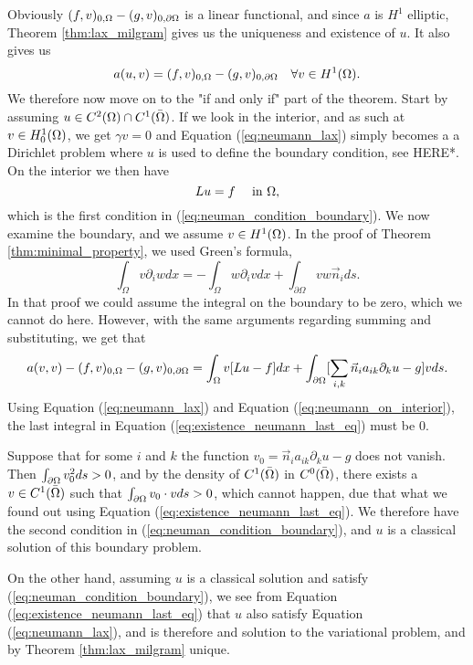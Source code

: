 \begin{bev}
   Obviously $ (f,v)_{0,\Omega} - (g,v)_{0,\partial\Omega}$ is a linear functional, 
   and since $a$ is $H^1$ elliptic, Theorem \ref{thm:lax_milgram} gives us the 
   uniqueness and existence of $u$.
   It also gives us 
   \begin{equation}
      a(u,v) = (f,v)_{0,\Omega} - (g,v)_{0,\partial\Omega} \quad \forall v \in H^1(\Omega). \label{eq:neumann_lax}
   \end{equation}
   We therefore now move on to the "if and only if" part of the theorem. Start by 
   assuming $u \in C^2(\Omega)\cap C^1(\bar{\Omega})$.
   If we look in the interior, and as such at $v \in H^1_0(\Omega)$, we get $\gamma v=0$ 
   and Equation (\ref{eq:neumann_lax}) simply becomes a a Dirichlet problem where 
   $u$ is used to define the boundary condition, see HERE*. %
   On the interior we then have 
   \begin{equation}
    Lu = f \quad \text{ in }\Omega, \label{eq:neumann_on_interior}
   \end{equation} 
   which is the first condition in (\ref{eq:neuman_condition_boundary}).
   We now examine the boundary, and we assume $v\in H^1(\Omega)$.
   In the proof of Theorem \ref{thm:minimal_property}, we used Green's formula,
    \begin{equation} %
        \int_\Omega v\partial_i w dx = -\int_\Omega w \partial_i v dx + \int_{\partial \Omega} v w \vec{n}_i ds.
    \end{equation}
   In that proof we could assume the integral on the boundary to be zero, which 
   we cannot do here. However, with the same arguments regarding summing and substituting, 
   we get that 
   \begin{equation}
      a(v,v) - (f,v)_{0,\Omega} - (g,v)_{0,\partial\Omega} = 
      \int_\Omega v[Lu - f] dx + \int_{\partial \Omega}
     [ \sum_{i,k}  \vec{n}_i a_{ik} \partial_k u-g]v ds.
     \label{eq:existence_neumann_last_eq}
   \end{equation}
   Using Equation (\ref{eq:neumann_lax}) and Equation (\ref{eq:neumann_on_interior}),
   the last integral in Equation (\ref{eq:existence_neumann_last_eq}) must be $0$.

   Suppose that for some $i$ and $k$ the function $v_0 = \vec{n}_i a_{ik} \partial_k u -g$ does 
   not vanish. Then $\int_{\partial\Omega}v_0^2ds>0$, and by the density of 
   $C^1(\bar{\Omega})$ in $C^0(\bar{\Omega})$, there exists a $v\in C^1(\bar{\Omega})$
   such that  $\int_{\partial\Omega}v_0\cdot vds>0$, which cannot happen, due that 
   what we found out using Equation (\ref{eq:existence_neumann_last_eq}). 
   We therefore have the second condition in (\ref{eq:neuman_condition_boundary}),
   and $u$ is a classical solution of this boundary problem.

   On the other hand, assuming $u$ is a classical solution and satisfy (\ref{eq:neuman_condition_boundary}),
   we see from Equation (\ref{eq:existence_neumann_last_eq}) that $u$ also satisfy 
   Equation (\ref{eq:neumann_lax}), and is therefore and solution to the variational 
   problem, and by Theorem \ref{thm:lax_milgram} unique.
\end{bev}